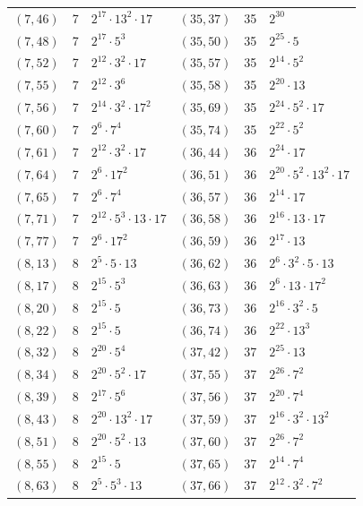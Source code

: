 \documentclass[11pt]{article}
\begin{document}
\begin{longtable}{@{}lrl@{\qquad}lrl@{}}
$(7,46)$ & 7 & $2^{17}\cdot 13^{2}\cdot 17$ & $(35,37)$ & 35 & $2^{30}$\\
$(7,48)$ & 7 & $2^{17}\cdot 5^{3}$ & $(35,50)$ & 35 & $2^{25}\cdot 5$\\
$(7,52)$ & 7 & $2^{12}\cdot 3^{2}\cdot 17$ & $(35,57)$ & 35 & $2^{14}\cdot 5^{2}$\\
$(7,55)$ & 7 & $2^{12}\cdot 3^{6}$ & $(35,58)$ & 35 & $2^{20}\cdot 13$\\
$(7,56)$ & 7 & $2^{14}\cdot 3^{2}\cdot 17^{2}$ & $(35,69)$ & 35 & $2^{24}\cdot 5^{2}\cdot 17$\\
$(7,60)$ & 7 & $2^{6}\cdot 7^{4}$ & $(35,74)$ & 35 & $2^{22}\cdot 5^{2}$\\
$(7,61)$ & 7 & $2^{12}\cdot 3^{2}\cdot 17$ & $(36,44)$ & 36 & $2^{24}\cdot 17$\\
$(7,64)$ & 7 & $2^{6}\cdot 17^{2}$ & $(36,51)$ & 36 & $2^{20}\cdot 5^{2}\cdot 13^{2}\cdot 17$\\
$(7,65)$ & 7 & $2^{6}\cdot 7^{4}$ & $(36,57)$ & 36 & $2^{14}\cdot 17$\\
$(7,71)$ & 7 & $2^{12}\cdot 5^{3}\cdot 13\cdot 17$ & $(36,58)$ & 36 & $2^{16}\cdot 13\cdot 17$\\
$(7,77)$ & 7 & $2^{6}\cdot 17^{2}$ & $(36,59)$ & 36 & $2^{17}\cdot 13$\\
$(8,13)$ & 8 & $2^{5}\cdot 5\cdot 13$ & $(36,62)$ & 36 & $2^{6}\cdot 3^{2}\cdot 5\cdot 13$\\
$(8,17)$ & 8 & $2^{15}\cdot 5^{3}$ & $(36,63)$ & 36 & $2^{6}\cdot 13\cdot 17^{2}$\\
$(8,20)$ & 8 & $2^{15}\cdot 5$ & $(36,73)$ & 36 & $2^{16}\cdot 3^{2}\cdot 5$\\
$(8,22)$ & 8 & $2^{15}\cdot 5$ & $(36,74)$ & 36 & $2^{22}\cdot 13^{3}$\\
$(8,32)$ & 8 & $2^{20}\cdot 5^{4}$ & $(37,42)$ & 37 & $2^{25}\cdot 13$\\
$(8,34)$ & 8 & $2^{20}\cdot 5^{2}\cdot 17$ & $(37,55)$ & 37 & $2^{26}\cdot 7^{2}$\\
$(8,39)$ & 8 & $2^{17}\cdot 5^{6}$ & $(37,56)$ & 37 & $2^{20}\cdot 7^{4}$\\
$(8,43)$ & 8 & $2^{20}\cdot 13^{2}\cdot 17$ & $(37,59)$ & 37 & $2^{16}\cdot 3^{2}\cdot 13^{2}$\\
$(8,51)$ & 8 & $2^{20}\cdot 5^{2}\cdot 13$ & $(37,60)$ & 37 & $2^{26}\cdot 7^{2}$\\
$(8,55)$ & 8 & $2^{15}\cdot 5$ & $(37,65)$ & 37 & $2^{14}\cdot 7^{4}$\\
$(8,63)$ & 8 & $2^{5}\cdot 5^{3}\cdot 13$ & $(37,66)$ & 37 & $2^{12}\cdot 3^{2}\cdot 7^{2}$\\

\end{longtable}
\end{document}
